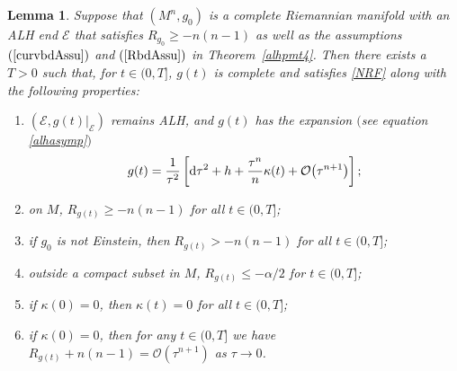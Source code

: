 \documentclass[10pt,a4paper]{amsart}
\numberwithin{equation}{section}
\newtheorem{Lemma}[Theorem]{Lemma}
\def\Ecal{\mathcal{E}}
\def\Ocal{\mathcal{O}}
\def\ed{{\rm d}}
\begin{document}
  \begin{Lemma}\label{nrfdeform}
Suppose that $(M^n, g_0)$ is a complete Riemannian manifold with an ALH end $\Ecal$
that satisfies $R_{g_0}\ge -n(n-1)$ as well as the assumptions
$(\ref{curvbdAssu})$ and $(\ref{RbdAssu})$ in Theorem~{\rm \ref{alhpmt4}}.
Then there exists a $T>0$ such that, for $t\in (0,T]$, $g(t)$ is complete and satisfies \eqref{NRF} along with the following properties:
\begin{enumerate}[$(i)$]\itemsep=0pt
	\item $(\Ecal, g(t)|_{\Ecal})$ remains ALH, and $g(t)$ has the expansion $($see equation \eqref{alhasymp}$)$
			\begin{equation*}%
				g(t) = \frac{1}{\tau^2}\left[\ed\tau^2 + h + \frac{\tau^n}{n}\kappa(t) + \Ocal\bigl(\tau^{n+1}\bigr)\right];
			\end{equation*}
	\item on $M$, $R_{g(t)}\geq -n(n-1)$ for all $t\in (0, T]$;
	\item if $g_0$ is not Einstein, then $R_{g(t)}> -n(n-1)$ for all $t\in (0,T]$; 	
	\item outside a compact subset in $M$, $R_{g(t)}\le -\alpha/2$ for $t\in (0,T]$;
	\item if $\kappa(0)=0$, then $\kappa(t)=0$ for all $t\in (0, T]$;
	\item if $\kappa(0)=0$, then for any $t\in (0,T]$ we have $R_{g(t)}+n(n-1)=\mathcal{O}(\tau^{n+1})$ as $\tau\rightarrow0$.
\end{enumerate}
\end{Lemma}
\end{document}
